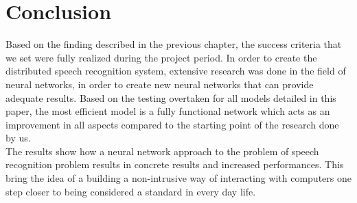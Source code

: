 \chapter{Conclusion}\label{ch:conclusion}


Based on the finding described in the previous chapter, the success criteria that we set were fully realized during the project period. In order to create the distributed speech recognition system, extensive research was done in the field of neural networks, in order to create new neural networks that can provide adequate results. Based on the testing overtaken for all models detailed in this paper, the most efficient model is a fully functional network which acts as an improvement in all aspects compared to the starting point of the research done by us. 
\\

The results show how a neural network approach to the problem of speech recognition problem results in concrete results and increased performances. This bring the idea of a building a non-intrusive way of interacting with computers one step closer to  being considered a standard in every day life.
 